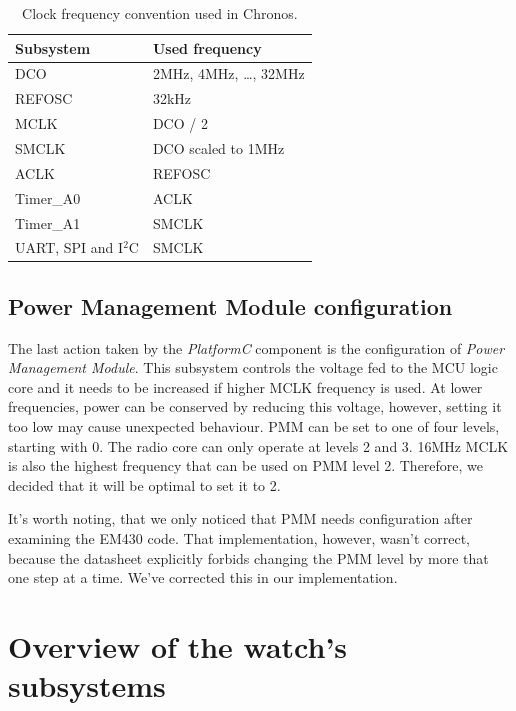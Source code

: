 \begin{table}
  \centering
  \begin{tabular}{ | l | l | }
    \hline
    Subsystem & Used frequency \\
    \hline
    DCO & 2MHz, 4MHz, \ldots, 32MHz \\
    REFOSC & 32kHz \\
    MCLK & DCO / 2 \\
    SMCLK & DCO scaled to 1MHz  \\
    ACLK & REFOSC \\
    Timer\_A0 & ACLK \\
    Timer\_A1 & SMCLK \\
    UART, SPI and I$^2$C & SMCLK \\
    \hline
  \end{tabular}
  \caption{Clock frequency convention used in Chronos.}
  \label{fig:clock_speeds}
\end{table}

\subsection{Power Management Module configuration}

The last action taken by the \emph{PlatformC} component is the configuration of \emph{Power Management Module}. This subsystem controls the voltage fed to the MCU logic core and it needs to be increased if higher MCLK frequency is used. At lower frequencies, power can be conserved by reducing this voltage, however, setting it too low may cause unexpected behaviour. PMM can be set to one of four levels, starting with 0. The radio core can only operate at levels 2 and 3. 16MHz MCLK is also the highest frequency that can be used on PMM level 2. Therefore, we decided that it will be optimal to set it to 2.

It's worth noting, that we only noticed that PMM needs configuration after examining the EM430 code. That implementation, however, wasn't correct, because the datasheet explicitly forbids changing the PMM level by more that one step at a time. We've corrected this in our implementation.

\section{Overview of the watch's subsystems}

